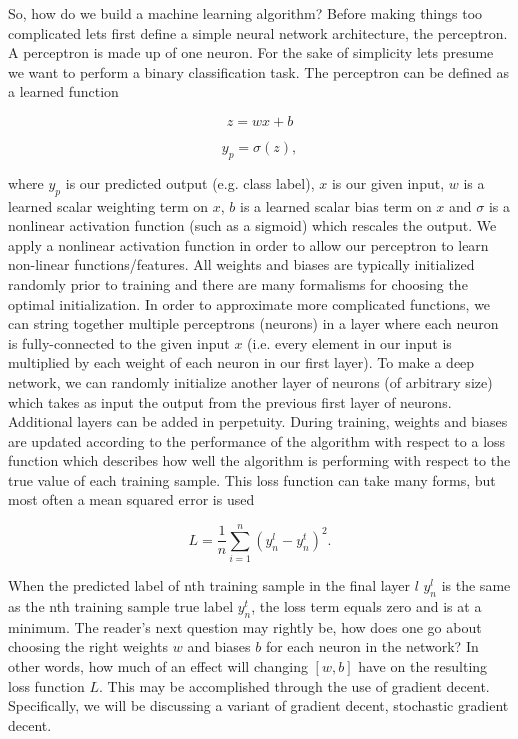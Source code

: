 %
%
So, how do we build a machine learning algorithm? Before making things too complicated lets first define a simple neural network architecture, the perceptron. A perceptron is made up of one neuron. For the sake of simplicity lets presume we want to perform a binary classification task. The perceptron can be defined as a learned function

\begin{equation}
    z = w x + b
\end{equation}{}

\begin{equation}
    y_{p} = \sigma(z),
\end{equation}{}

where $y_{p}$ is our predicted output (e.g. class label), $x$ is our given input, $w$ is a learned scalar weighting term on $x$, $b$ is a learned scalar bias term on $x$ and $\sigma$ is a nonlinear activation function (such as a sigmoid) which rescales the output. We apply a nonlinear activation function in order to allow our perceptron to learn non-linear functions/features. All weights and biases are typically initialized randomly prior to training and there are many formalisms for choosing the optimal initialization. In order to approximate more complicated functions, we can string together multiple perceptrons (neurons) in a layer where each neuron is fully-connected to the given input $x$ (i.e. every element in our input is multiplied by each weight of each neuron in our first layer). To make a deep network, we can randomly initialize another layer of neurons (of arbitrary size) which takes as input the output from the previous first layer of neurons. Additional layers can be added in perpetuity. During training, weights and biases are updated according to the performance of the algorithm with respect to a loss function which describes how well the algorithm is performing with respect to the true value of each training sample. This loss function can take many forms, but most often a mean squared error is used

\begin{equation}
    L = \frac{1}{n} \sum_{i=1}^{n}(y^{l}_n-y^{t}_n)^2.
\end{equation}{}

%
%
When the predicted label of nth training sample in the final layer $l$ $y^{l}_n$ is the same as the nth training sample true label $y^{t}_n$, the loss term equals zero and is at a minimum. The reader's next question may rightly be, how does one go about choosing the right weights $w$ and biases $b$ for each neuron in the network? In other words, how much of an effect will changing $[w,b]$ have on the resulting loss function $L$. This may be accomplished through the use of gradient decent. Specifically, we will be discussing a variant of gradient decent, stochastic gradient decent.

